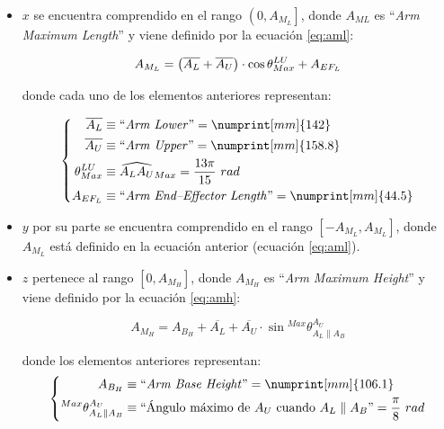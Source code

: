 \begin{itemize}
    \item $x$ se encuentra comprendido en el rango $\left(0, A_{M_L}\right]$, donde $A_{ML}$
          es ``\textit{Arm Maximum Length}'' y viene definido por la ecuación \ref{eq:aml}:

          \begin{equation}\label{eq:aml}
              A_{M_L} = \left(\overline{A_L} + \overline{A_U}\right) \cdot \cos{\theta^{LU}_{Max}} + A_{EF_L}\\
          \end{equation}

          donde cada uno de los elementos anteriores representan:

          \begin{equation*}
              \left\{\begin{aligned}
                  \overline{A_L}    & \equiv \text{``\textit{Arm Lower}''} = \numprint[mm]{142}                 \\
                  \overline{A_U}    & \equiv \text{``\textit{Arm Upper}''} = \numprint[mm]{158.8}               \\
                  \theta^{LU}_{Max} & \equiv \widehat{A_L A_U}_{Max} = \frac{13\pi}{15}~rad                     \\
                  A_{EF_L}          & \equiv \text{``\textit{Arm End--Effector Length}''} = \numprint[mm]{44.5} \\
              \end{aligned}
              \right.
          \end{equation*}

    \item $y$ por su parte se encuentra comprendido en el rango $\left[-A_{M_L}, A_{M_L}\right]$,
          donde $A_{M_L}$ está definido en la ecuación anterior (ecuación \ref{eq:aml}).
    \item $z$ pertenece al rango $\left[0, A_{M_H}\right]$, donde $A_{M_H}$ es
          ``\textit{Arm Maximum Height}'' y viene definido por la ecuación \ref{eq:amh}:

          \begin{equation}\label{eq:amh}
              A_{M_H} = A_{B_H} + \overline{A_L} + \overline{A_U} \cdot \sin{^{Max}\theta^{A_U}_{A_L \parallel A_B}}
          \end{equation}

          donde los elementos anteriores representan:
          \begin{equation*}
              \left\{\begin{aligned}
                  A_{B_H}                                & \equiv \text{``\textit{Arm Base Height}''} = \numprint[mm]{106.1}                       \\
                  ^{Max}\theta^{A_U}_{A_L \parallel A_B} & \equiv \text{``Ángulo máximo de $A_U$ cuando $A_L \parallel A_B$''} = \frac{\pi}{8}~rad \\
              \end{aligned}
              \right.
          \end{equation*}
\end{itemize}

